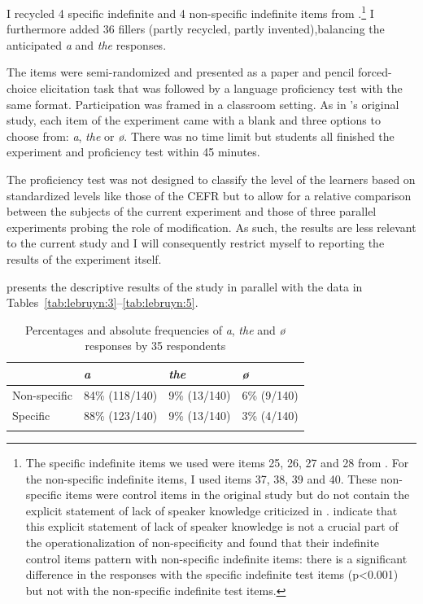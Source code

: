 \documentclass[output=paper,
modfonts
]{langscibook}
\begin{document}
I recycled 4 specific indefinite and 4 non-specific indefinite items from \citet{IoninKoWexler2004}.\footnote{The specific indefinite items we used were items 25, 26, 27 and 28 from \citet{IoninKoWexler2004}. For the non-specific indefinite items, I used items 37, 38, 39 and 40. These non-specific items were control items in the original study but do not contain the explicit statement of lack of speaker knowledge criticized in \citet{Trenkic2008}. \citet{IoninZubizarretaPhilippov2009} indicate that this explicit statement of lack of speaker knowledge is not a crucial part of the operationalization of non-specificity and \citet{IoninKoWexler2004} found that their indefinite control items pattern with non-specific indefinite items: there is a significant difference in the responses with the specific indefinite test items (p<0.001) but not with the non-specific indefinite test items.} I furthermore added 36 fillers (partly recycled, partly invented),\largerpage balancing the anticipated \textit{a} and \textit{the} responses.

The items were semi-randomized and presented as a paper and pencil forced-choice elicitation task that was followed by a language proficiency test with the same format. Participation was framed in a classroom setting. As in \citeauthor{IoninKoWexler2004}’s original study, each item of the experiment came with a blank and three options to choose from: \textit{a}, \textit{the} or \textit{ø}. There was no time limit but students all finished the experiment and proficiency test within 45 minutes. 

The proficiency test was not designed to classify the level of the learners based on standardized levels like those of the CEFR but to allow for a relative comparison between the subjects of the current experiment and those of three parallel experiments probing the role of modification. As such, the results are less relevant to the current study and I will consequently restrict myself to reporting the results of the experiment itself.

 presents the descriptive results of the study in parallel with the data in Tables~\ref{tab:lebruyn:3}--\ref{tab:lebruyn:5}.

\begin{table}[h]
\begin{tabularx}{\textwidth}{XXXX}
\lsptoprule
 & \textit{a} & \textit{the} &  \textit{ø} \\
\midrule
Non-specific & 84\% (118/140) & 9\% (13/140) & 6\% (9/140)  \\
Specific & 88\% (123/140) & 9\% (13/140) & 3\% (4/140) \\
\lspbottomrule
\end{tabularx}
\caption{Percentages and absolute frequencies of \textit{a}, \textit{the} and \textit{ø} responses by 35  respondents}
\label{tab:lebruyn:6}
\end{table}
\end{document}

